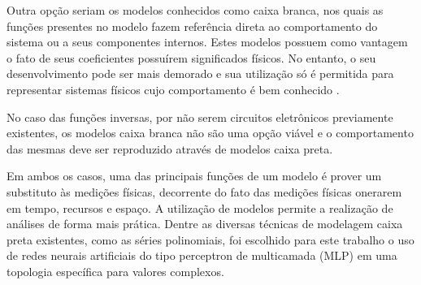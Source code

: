 Outra opção seriam os modelos conhecidos como caixa branca, nos quais as funções presentes no modelo fazem referência direta ao comportamento do sistema ou a seus componentes internos. Estes modelos possuem como vantagem o fato de seus coeficientes possuírem significados físicos. No entanto, o seu desenvolvimento pode ser mais demorado e sua utilização só é permitida para representar sistemas físicos cujo comportamento é bem conhecido \cite{8882211}.

No caso das funções inversas, por não serem circuitos eletrônicos previamente existentes, os modelos caixa branca não são uma opção viável e o comportamento das mesmas deve ser reproduzido através de modelos caixa preta.

Em ambos os casos, uma das principais funções de um modelo é prover um substituto às medições físicas, decorrente do fato das medições físicas onerarem em tempo, recursos e espaço. A utilização de modelos permite a realização de análises de forma mais prática.
Dentre as diversas técnicas de modelagem caixa preta existentes, como as séries polinomiais, foi escolhido para este trabalho o uso de redes neurais artificiais do tipo perceptron de multicamada (MLP) em uma topologia específica para valores complexos.

